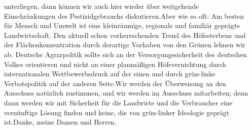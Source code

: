 \documentclass{article}
\begin{document}
unterliegen, dann können wir auch hier wieder über weitgehende Einschränkungen des Pestizidgebrauchs diskutieren.Aber wie so oft: Am besten für Mensch und Umwelt ist eine kleinräumige, regionale und familiär geprägte Landwirtschaft. Den aktuell schon vorherrschenden Trend des Höfesterbens und der Flächenkonzentration durch derartige Vorhaben von den Grünen lehnen wir ab. Deutsche Agrarpolitik sollte sich an der Versorgungssicherheit des deutschen Volkes orientieren und nicht an einer planmäßigen Höfevernichtung durch internationalen Wettbewerbsdruck auf der einen und durch grün-linke Verbotspolitik auf der anderen Seite.Wir werden der Überweisung an den Ausschuss natürlich zustimmen, und wir werden im Ausschuss mitarbeiten; denn dann werden wir mit Sicherheit für die Landwirte und die Verbraucher eine vernünftige Lösung finden und keine, die von grün-linker Ideologie geprägt ist.Danke, meine Damen und Herren.
\end{document}
